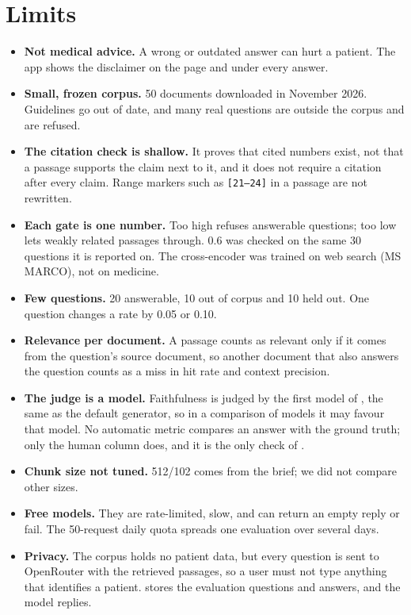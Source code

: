 \section{Limits}
\label{sec:limits}

\begin{itemize}[leftmargin=1.5em]
  \item \textbf{Not medical advice.} A wrong or outdated answer can hurt a patient. The app shows the
        disclaimer on the page and under every answer.
  \item \textbf{Small, frozen corpus.} 50 documents downloaded in November 2026. Guidelines go out of
        date, and many real questions are outside the corpus and are refused.
  \item \textbf{The citation check is shallow.} It proves that cited numbers exist, not that a
        passage supports the claim next to it, and it does not require a citation after every claim.
        Range markers such as \texttt{[21--24]} in a passage are not rewritten.
  \item \textbf{Each gate is one number.} Too high refuses answerable questions; too low lets weakly
        related passages through. 0.6 was checked on the same 30 questions it is reported on. The
        cross-encoder was trained on web search (MS MARCO), not on medicine.
  \item \textbf{Few questions.} 20 answerable, 10 out of corpus and 10 held out. One question changes
        a rate by 0.05 or 0.10.
  \item \textbf{Relevance per document.} A passage counts as relevant only if it comes from the
        question's source document, so another document that also answers the question counts as a
        miss in hit rate and context precision.
  \item \textbf{The judge is a model.} Faithfulness is judged by the first model of
        , the same as the default generator, so in a comparison of models it may
        favour that model. No automatic metric compares an answer with the ground truth; only the
        human  column does, and it is the only check of .
  \item \textbf{Chunk size not tuned.} 512/102 comes from the brief; we did not compare other sizes.
  \item \textbf{Free models.} They are rate-limited, slow, and can return an empty reply or fail.
        The 50-request daily quota spreads one evaluation over several days.
  \item \textbf{Privacy.} The corpus holds no patient data, but every question is sent to OpenRouter
        with the retrieved passages, so a user must not type anything that identifies a patient.
         stores the evaluation questions and answers, and
         the model replies.
\end{itemize}


